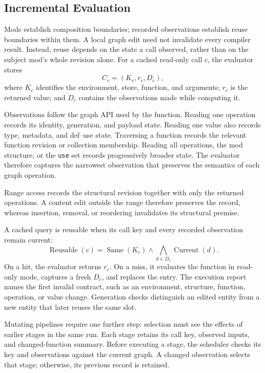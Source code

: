 \subsection{Incremental Evaluation}
\label{sec:incremental}

Mods establish composition boundaries; recorded observations establish reuse
boundaries within them. A local graph edit need not invalidate every compiler
result. Instead, reuse depends on the state a call observed, rather than on the
subject mod's whole revision alone. For a cached read-only call $c$, the evaluator stores
\[
  C_c = (K_c, r_c, D_c),
\]
where $K_c$ identifies the environment, store, function, and arguments; $r_c$
is the returned value; and $D_c$ contains the observations made while computing
it.

Observations follow the graph API used by the function. Reading one operation
records its identity, generation, and payload state. Reading one value also
records type, metadata, and def--use state. Traversing a function records the
relevant function revision or collection membership. Reading all operations,
the mod structure, or the \texttt{use} set records progressively broader state.
The evaluator therefore captures the narrowest observation that preserves the
semantics of each graph operation.

Range access records the structural revision together with only the returned
operations. A content edit outside the range therefore preserves the record,
whereas insertion, removal, or reordering invalidates its structural premise.

A cached query is reusable when its call key and every recorded observation
remain current:
\[
  \operatorname{Reusable}(c) = \operatorname{Same}(K_c) \land
  \bigwedge_{d \in D_c} \operatorname{Current}(d).
\]
On a hit, the evaluator returns $r_c$. On a miss, it evaluates the function in
read-only mode, captures a fresh $D_c$, and replaces the entry. The execution
report names the first invalid contract, such as an environment, structure,
function, operation, or value change. Generation checks distinguish an edited
entity from a new entity that later reuses the same slot.

Mutating pipelines require one further step: selection must see the effects
of earlier stages in the same run. Each stage retains its call key, observed
inputs, and changed-function summary. Before executing a stage, the scheduler
checks its key and observations against the current graph. A changed observation
selects that stage; otherwise, its previous record is retained.

